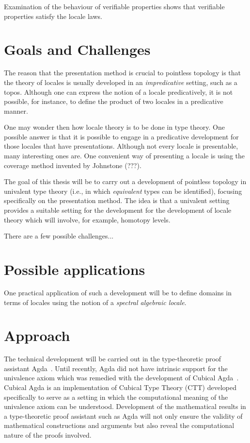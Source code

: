 \documentclass{article}
\begin{document}
Examination of the behaviour of verifiable properties shows that verifiable properties
satisfy the locale laws.

\section{Goals and Challenges}

The reason that the presentation method is crucial to pointless topology is that the
theory of locales is usually developed in an \emph{impredicative} setting, such as a
topos. Although one can express the notion of a locale predicatively, it is not possible,
for instance, to define the product of two locales in a predicative manner.

One may wonder then how locale theory is to be done in type theory. One possible answer is
that it is possible to engage in a predicative development for those locales that have
presentations. Although not every locale is presentable, many interesting ones are. One
convenient way of presenting a locale is using the coverage method invented by Johnstone
(???).

The goal of this thesis will be to carry out a development of pointless topology in
univalent type theory (i.e., in which \emph{equivalent} types can be identified), focusing
specifically on the presentation method. The idea is that a univalent setting provides a
suitable setting for the development for the development of locale theory which will
involve, for example, homotopy levels.

There are a few possible challenges...


\section{Possible applications}

One practical application of such a development will be to define domains in terms of
locales using the notion of a \emph{spectral algebraic locale}.

\section{Approach}

The technical development will be carried out in the type-theoretic proof assistant
Agda~\cite{norell:2008}. Until recently, Agda did not have intrinsic support for the
univalence axiom which was remedied with the development of Cubical
Agda~\cite{cubicalagda}. Cubical Agda is an implementation of Cubical Type Theory (CTT)
developed specifically to serve as a setting in which the computational meaning of the
univalence axiom can be understood. Development of the mathematical results in a
type-theoretic proof assistant such as Agda will not only ensure the validity of
mathematical constructions and arguments but also reveal the computational nature of the
proofs involved.
\end{document}
